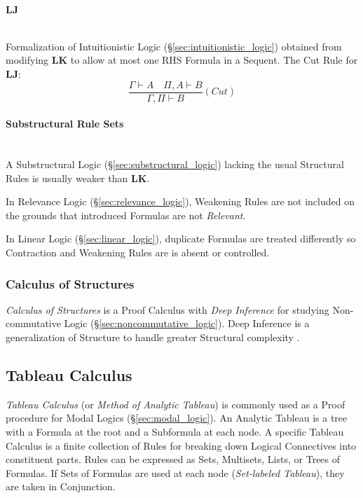 \paragraph{$\mathbf{LJ}$}\label{sec:lj} \hfill \\

Formalization of Intuitionistic Logic
(\S\ref{sec:intuitionistic_logic}) obtained from modifying
$\mathbf{LK}$ to allow at most one RHS Formula in a Sequent. The Cut
Rule for $\mathbf{LJ}$:
\[
    \frac{
        \Gamma \vdash A \quad \Pi, A \vdash B
    }{
        \Gamma, \Pi \vdash B
    }(Cut)
\]



\paragraph{Substructural Rule Sets}\label{sec:substructural_rule}
\hfill \\

A Substructural Logic (\S\ref{sec:substructural_logic}) lacking the
usual Structural Rules is usually weaker than $\mathbf{LK}$.

In Relevance Logic (\S\ref{sec:relevance_logic}), Weakening Rules
are not included on the grounds that introduced Formulas are not
\emph{Relevant}.

In Linear Logic (\S\ref{sec:linear_logic}), duplicate Formulas are
treated differently so Contraction and Weakening Rules are is absent
or controlled.



\subsubsection{Calculus of Structures}\label{sec:calculus_of_structures}

\emph{Calculus of Structures} is a Proof Calculus with \emph{Deep
  Inference} for studying Non-commutative Logic
(\S\ref{sec:noncommutative_logic}). Deep Inference is a
generalization of Structure to handle greater Structural complexity
\cite{schutte77}.



\subsection{Tableau Calculus}\label{sec:tableau_calculus}

\emph{Tableau Calculus} (or \emph{Method of Analytic Tableau}) is
commonly used as a Proof procedure for Modal Logics
(\S\ref{sec:modal_logic}). An Analytic Tableau is a tree with a
Formula at the root and a Subformula at each node. A specific Tableau
Calculus is a finite collection of Rules for breaking down Logical
Connectives into constituent parts. Rules can be expressed as Sets,
Multisets, Lists, or Trees of Formulas. If Sets of Formulas are used
at each node (\emph{Set-labeled Tableau}), they are taken in
Conjunction.

